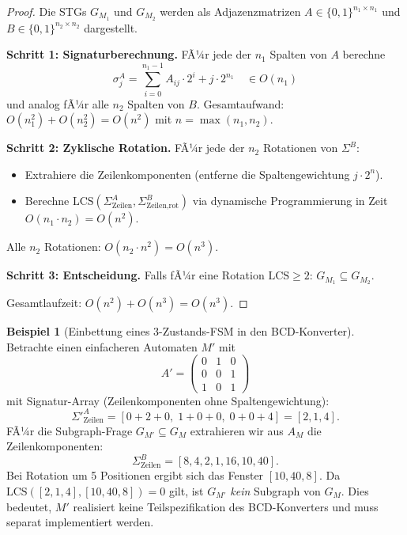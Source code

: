 ﻿\documentclass[a4paper,12pt]{article}
\theoremstyle{definition}
\newtheorem{beispiel}{Beispiel}
\begin{document}
\begin{proof}
  Die STGs $G_{M_1}$ und $G_{M_2}$ werden als Adjazenzmatrizen $A \in \{0,1\}^{n_1 \times n_1}$
  und $B \in \{0,1\}^{n_2 \times n_2}$ dargestellt.

  \textbf{Schritt 1: Signaturberechnung.}
  FÃ¼r jede der $n_1$ Spalten von $A$ berechne
  \[
    \sigma_j^A = \sum_{i=0}^{n_1-1} A_{ij} \cdot 2^i + j \cdot 2^{n_1}
    \quad \in O(n_1)
  \]
  und analog fÃ¼r alle $n_2$ Spalten von $B$. Gesamtaufwand: $O(n_1^2) + O(n_2^2) = O(n^2)$
  mit $n = \max(n_1, n_2)$.

  \textbf{Schritt 2: Zyklische Rotation.}
  FÃ¼r jede der $n_2$ Rotationen von $\Sigma^B$:
  \begin{itemize}
    \item Extrahiere die Zeilenkomponenten (entferne die Spaltengewichtung $j \cdot 2^n$).
    \item Berechne $\text{LCS}(\Sigma^A_{\text{Zeilen}}, \Sigma^B_{\text{Zeilen,rot}})$ via
          dynamische Programmierung in Zeit $O(n_1 \cdot n_2) = O(n^2)$.
  \end{itemize}
  Alle $n_2$ Rotationen: $O(n_2 \cdot n^2) = O(n^3)$.

  \textbf{Schritt 3: Entscheidung.}
  Falls fÃ¼r eine Rotation $\text{LCS} \geq 2$: $G_{M_1} \subseteq G_{M_2}$.

  Gesamtlaufzeit: $O(n^2) + O(n^3) = O(n^3)$.
\end{proof}

\begin{beispiel}[Einbettung eines 3-Zustands-FSM in den BCD-Konverter]\label{bsp:fsm}
  Betrachte einen einfacheren Automaten $M'$ mit
  \[
    A' = \begin{pmatrix} 0 & 1 & 0 \\ 0 & 0 & 1 \\ 1 & 0 & 1 \end{pmatrix}
  \]
  mit Signatur-Array (Zeilenkomponenten ohne Spaltengewichtung):
  \[
    \Sigma'^{A}_{\text{Zeilen}} = [0+2+0,\; 1+0+0,\; 0+0+4] = [2, 1, 4].
  \]
  FÃ¼r die Subgraph-Frage $G_{M'} \subseteq G_M$ extrahieren wir aus $A_M$ die
  Zeilenkomponenten:
  \[
    \Sigma^B_{\text{Zeilen}} = [8, 4, 2, 1, 16, 10, 40].
  \]
  Bei Rotation um 5 Positionen ergibt sich das Fenster $[10, 40, 8]$. Da
  $\text{LCS}([2, 1, 4], [10, 40, 8]) = 0$ gilt, ist $G_{M'}$ \emph{kein} Subgraph
  von $G_M$. Dies bedeutet, $M'$ realisiert keine Teilspezifikation des BCD-Konverters
  und muss separat implementiert werden.
\end{beispiel}
\end{document}
